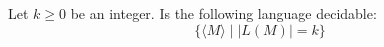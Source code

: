 Let $k \geq 0$ be an integer.
Is the following language decidable:
\[
\{ \langle M \rangle \mid |L(M)| = k \}
\]
